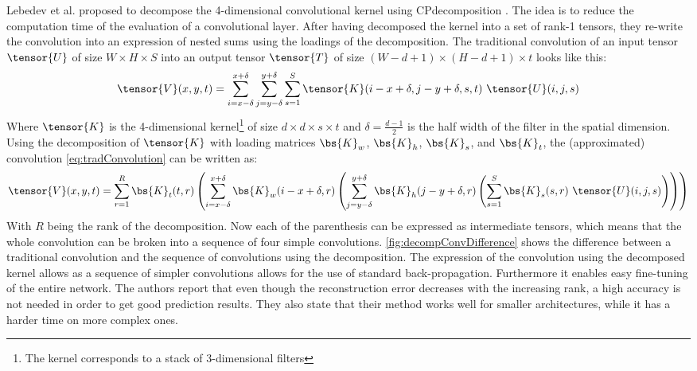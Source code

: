 Lebedev et al. proposed to decompose the 4-dimensional convolutional kernel using CP\Hyphdash decomposition \cite{Lebedev2015}. The idea is to reduce the computation time of the evaluation of a convolutional layer. After having decomposed the kernel into a set of rank-1 tensors, they re-write the convolution into an expression of nested sums using the loadings of the decomposition. The traditional convolution of an input tensor $\tensor{U}$ of size $W \times H \times S$ into an output tensor $\tensor{T}$ of size $(W-d+1)\times (H-d+1)\times t$ looks like this:
\begin{equation}
    \tensor{V}(x, y, t)=\sum_{i=x-\delta}^{x+\delta} \sum_{j=y-\delta}^{y+\delta} \sum_{s=1}^{S} \tensor{K}(i-x+\delta, j-y+\delta, s, t) \ \tensor{U}(i, j, s)
    \label{eq:tradConvolution}
\end{equation}
Where $\tensor{K}$ is the 4-dimensional kernel\footnote{The kernel corresponds to a stack of 3-dimensional filters} of size $d\times d \times s\times t$ and $\delta = \frac{d-1}{2}$ is the half width of the filter in the spatial dimension. Using the decomposition of $\tensor{K}$ with loading matrices $\bs{K}_w$, $\bs{K}_h$, $\bs{K}_s$, and $\bs{K}_t$, the (approximated) convolution \eqref{eq:tradConvolution} can be written as:
\begin{equation}
    \tensor{V}(x, y, t) = \sum_{r=1}^{R} \bs{K}_{t}(t, r)\left(\sum_{i=x-\delta}^{x+\delta} \bs{K}_{w}(i-x+\delta, r)\left(\sum_{j=y-\delta}^{y+\delta} \bs{K}_{h}(j-y+\delta, r)\left(\sum_{s=1}^{S} \bs{K}_{s}(s, r) \ \tensor{U}(i, j, s)\right)\right)\right)
\end{equation}
With $R$ being the rank of the decomposition. Now each of the parenthesis can be expressed as intermediate tensors, which means that the whole convolution can be broken into a sequence of four simple convolutions. \autoref{fig:decompConvDifference} shows the difference between a traditional convolution and the sequence of convolutions using the decomposition. The expression of the convolution using the decomposed kernel allows as a sequence of simpler convolutions allows for the use of standard back-propagation. Furthermore it enables easy fine-tuning of the entire network. The authors report that even though the reconstruction error decreases with the increasing rank, a high accuracy is not needed in order to get good prediction results. They also state that their method works well for smaller architectures, while it has a harder time on more complex ones.


